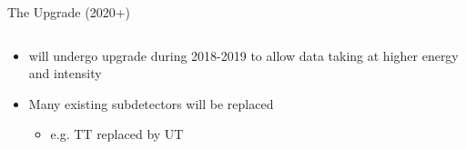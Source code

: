 \documentclass[aspectratio=1610]{beamer}
\begin{document}
\begin{frame}{The \lhcb Upgrade (2020+)}

\begin{columns}
\begin{column}{0.6\textwidth}
  \begin{itemize}
    \item \lhcb  will undergo upgrade during 2018-2019 to allow data taking at higher energy and intensity
    \item Many existing subdetectors will be replaced
    \begin{itemize}
      \item[\ding{80}] e.g. TT replaced by UT
    \end{itemize}
  \end{itemize}


\end{column}
\end{columns}
\end{frame}
\end{document}
